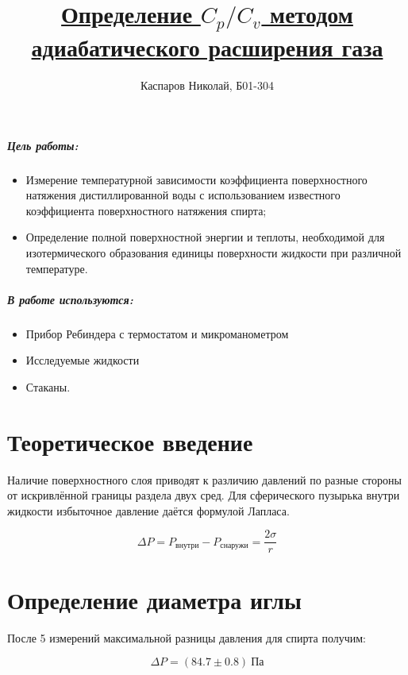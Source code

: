 \documentclass[a4paper]{article}
\title{\underline{Определение $C_p / C_v$ методом адиабатического расширения газа}}
\author{Каспаров Николай, Б01-304}
\begin{document}
\maketitle
\begin{center}
\Large{\textbf{ }}
\end{center}

\subparagraph{Цель работы:}
    \begin{itemize}
        \item Измерение температурной зависимости коэффициента поверхностного натяжения 
            дистиллированной воды с использованием 
            известного коэффициента поверхностного натяжения спирта; 

        \item Определение полной поверхностной энергии и теплоты, 
            необходимой для изотермического образования единицы 
            поверхности жидкости при различной температуре.
    \end{itemize}

\subparagraph{В работе используются:}
    \begin{itemize}
        \item Прибор Ребиндера с термостатом и микроманометром
        \item Исследуемые жидкости
        \item Стаканы.

    \end{itemize}

\section{Теоретическое введение}

Наличие поверхностного слоя приводят к различию давлений по разные стороны
от искривлённой границы раздела двух сред. Для сферического пузырька
внутри жидкости избыточное давление даётся формулой Лапласа.

\begin{equation}
    \Delta P = P_\text{внутри} - P_\text{снаружи} = \frac{2\sigma}{r}
\end{equation}

\section{Определение диаметра иглы}

После 5 измерений максимальной разницы давления для спирта получим:

\begin{equation*}
    \Delta P = (84.7 \pm 0.8) \:\text{Па}
\end{equation*}
\end{document}
